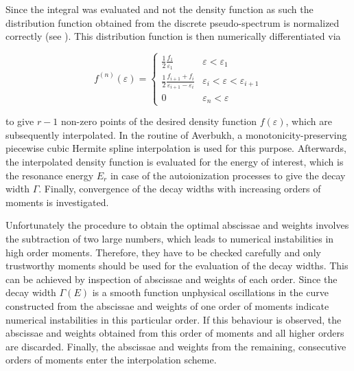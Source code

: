 Since the integral was evaluated and not the density function as such
the distribution function obtained from the
discrete pseudo-spectrum is normalized correctly (see \cite{Reinhardt79}).
This distribution function is then numerically differentiated via 
                                                                  
\begin{equation}                                                  
  f^{(n)} (\varepsilon) =                                              
  \begin{cases}                                                   
    \frac 12 \frac{f_1}{\varepsilon_1}    & \varepsilon < \varepsilon_1\\        
    \frac 12 \frac{f_{i+1} + f_i}{\varepsilon_{i+1} - \varepsilon_i}        
                                   & \varepsilon_i < \varepsilon < \varepsilon_{i+1}\\
    0                              & \varepsilon_n < \varepsilon
  \end{cases}                                                     
\end{equation}                                                    
                                                                  
to give  $r-1$ non-zero points of the desired                     
density function $f(\varepsilon)$, which are                           
subsequently interpolated.
In the routine of Averbukh, a          
monotonicity-preserving piecewise cubic Hermite spline interpolation
is used for this purpose. Afterwards, the interpolated density function is evaluated
for the energy of interest, which is the resonance energy $E_r$ in case of the  
autoionization processes to give the decay width $\Gamma$. 
Finally, convergence of the decay widths with increasing orders of
moments is investigated.

Unfortunately the procedure to obtain the optimal abscissae and weights
involves the subtraction of two large numbers, which
leads to numerical instabilities in high order moments. Therefore, they have to
be checked carefully and only trustworthy moments should be
used for the evaluation of the decay widths.
This can be achieved by inspection of abscissae and weights of each order.
Since the decay width $\Gamma(E)$ is a smooth function
unphysical oscillations in the curve constructed
from the abscissae and weights of one order of moments indicate numerical
instabilities in this particular order.
If this behaviour is observed, the abscissae and weights obtained from this
order of moments and all higher orders are discarded.
Finally, the abscissae
and weights from the remaining, consecutive orders of moments enter
the interpolation scheme.
